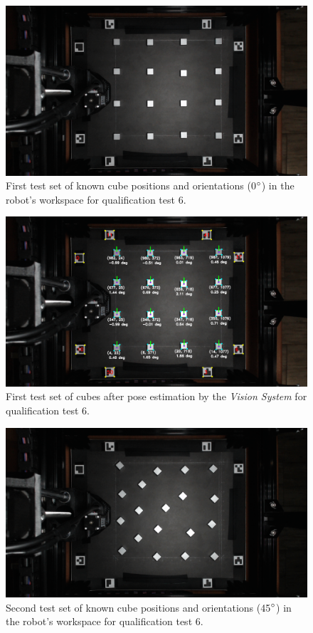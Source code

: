 \begin{figure}[H]
	\centering
	\includegraphics[width=1\linewidth]{figures/qtp6-set1.png}
	\caption{First test set of known cube positions and orientations (0$^{\circ}$) in the robot's workspace for qualification test 6.}
	\label{fig:qtp6-set1}
\end{figure}

\begin{figure}[H]
	\centering
	\includegraphics[width=1\linewidth]{figures/qtp6-set1-annotated.png}
	\caption{First test set of cubes after pose estimation by the \textit{Vision System} for qualification test 6.}
	\label{fig:qtp6-set1-annotated}
\end{figure}

\begin{figure}[H]
	\centering
	\includegraphics[width=1\linewidth]{figures/qtp6-set2.png}
	\caption{Second test set of known cube positions and orientations (45$^{\circ}$) in the robot's workspace for qualification test 6.}
	\label{fig:qtp6-set2}
\end{figure}

